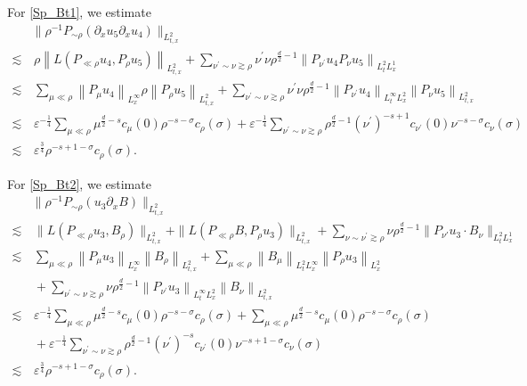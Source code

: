 \documentclass[11pt,letterpaper,reqno]{amsart}
\numberwithin{equation}{section}
\theoremstyle{definition}
\theoremstyle{remark}
\newcommand{\pa}{\partial}
\begin{document}
For \eqref{Sp_Bt1}, we estimate 
\begin{align*}
	&\|\rho^{-1}P_{\sim \rho}(\pa_x u_5\pa_x u_4)\|_{L^2_{t,x}}\\
	\lesssim &\,  \rho\left\|L(P_{\ll \rho}   u_4,  P_\rho   u_5)\right\|_{L^2_{t,x}}  + \sum_{\nu^\prime \sim \nu  \gtrsim \rho} \nu^\prime \nu \rho^{\frac d2-1} \left\|	P_{ \nu^\prime}   u_4  P_{ \nu }   u_5\right\|_{L^2_{t }L^1_x}  \\
	  \lesssim& \,   \sum_{\mu \ll \rho }\left\|P_{ \mu}  u_4 \right\|_{L^\infty_x} \rho \left\| P_\rho  u_5\right\|_{L^2_{t,x}} + \sum_{\nu^\prime \sim \nu  \gtrsim \rho} \nu^\prime \nu \rho^{\frac d2 -1} \left\|	P_{ \nu^\prime}   u_4  \right\|_{L^\infty_t L^2_{x}} \left\|P_{ \nu }   u_5\right\|_{L^2_{t,x}}  \\
 \lesssim &\,  \varepsilon^{-\frac 14}\sum_{\mu \ll \rho } \mu^{\frac d2-s} c_{\mu}(0) \rho^{-s-\sigma} c_\rho(\sigma)  + \varepsilon^{-\frac 14} \sum_{\nu^\prime \sim \nu  \gtrsim \rho}    \rho^{\frac d2 -1}  (\nu^\prime)^{- s + 1} c_{\nu^\prime}(0)  \nu^{-s -\sigma} c_{\nu }(\sigma) \\ 
  \lesssim&\, \varepsilon^{\frac 34}\rho^{-s + 1-\sigma} c_\rho(\sigma).
\end{align*}
 
For \eqref{Sp_Bt2}, we estimate 
\begin{align*}
	&\|\rho^{-1}P_{\sim \rho}( u_3 \pa_x B)\|_{L^2_{t,x}} \\
    \lesssim &\,  \|L(P_{\ll \rho}  u_3,    B_{\rho}   )\|_{L^2_{t,x}}  + \|L(P_{\ll \rho}  B,    P_{\rho} u_3 )\|_{L^2_{t,x}}   + \sum_{ \nu\sim \nu^\prime\gtrsim \rho } \nu \rho^{\frac d2 -1 }\| P_{\nu'} u_3 \cdot B_\nu \|_{L^2_{t }L^1_x}\\
   \lesssim&\,    \sum_{\mu \ll \rho }\left\|P_{ \mu}  u_3 \right\|_{L^\infty_x} \left\| B_\rho   \right\|_{L^2_{t,x}} +\sum_{\mu \ll \rho }\left\| B_{ \mu}  \right\|_{L^2_t L^\infty_x}   \left\| P_\rho u_3    \right\|_{L^2_{x}}\\
   &\,+ \sum_{\nu^\prime \sim \nu  \gtrsim \rho}  \nu \rho^{\frac d2 -1} \left\|	P_{ \nu^\prime}   u_3  \right\|_{L^\infty_t L^2_{x}} \left\|B_{ \nu }    \right\|_{L^2_{t,x}}  \\
  \lesssim &\,  \varepsilon^{-\frac 14}\sum_{\mu \ll \rho } \mu^{\frac d2-s} c_{\mu}(0) \rho^{-s-\sigma} c_\rho(\sigma) + \sum_{\mu \ll \rho }\mu^{\frac d2 -s} c_{\mu}(0) \rho^{-s-\sigma} c_\rho(\sigma) \\
  &\,  + \varepsilon^{-\frac 14} \sum_{\nu^\prime \sim \nu  \gtrsim \rho}    \rho^{\frac d2 -1}  (\nu^\prime)^{- s } c_{\nu^\prime}(0)  \nu^{-s + 1-\sigma} c_{\nu }(\sigma) \\
  \lesssim&\,  \varepsilon^{\frac 34}\rho^{-s + 1-\sigma} c_\rho(\sigma).
\end{align*}
\end{document}
